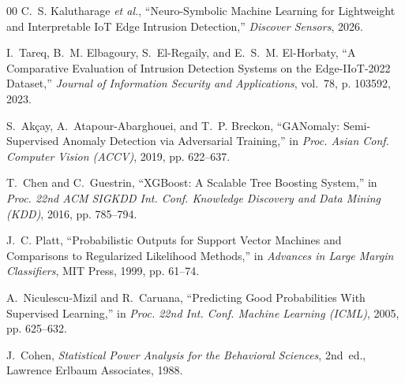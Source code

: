 \documentclass[pdflatex,sn-mathphys-num]{sn-jnl}
\theoremstyle{thmstyleone}
\theoremstyle{thmstyletwo}
\theoremstyle{thmstylethree}
\begin{document}
\begin{thebibliography}{00}
C.~S. Kalutharage \emph{et al.}, ``Neuro-Symbolic Machine Learning for Lightweight and Interpretable IoT Edge Intrusion Detection,'' \emph{Discover Sensors}, 2026.

I.~Tareq, B.~M. Elbagoury, S.~El-Regaily, and E.~S.~M. El-Horbaty, ``A Comparative Evaluation of Intrusion Detection Systems on the Edge-IIoT-2022 Dataset,'' \emph{Journal of Information Security and Applications}, vol.~78, p. 103592, 2023.

S.~Ak{\c c}ay, A.~Atapour-Abarghouei, and T.~P. Breckon, ``GANomaly: Semi-Supervised Anomaly Detection via Adversarial Training,'' in \emph{Proc. Asian Conf. Computer Vision (ACCV)}, 2019, pp. 622--637.

T.~Chen and C.~Guestrin, ``XGBoost: A Scalable Tree Boosting System,'' in \emph{Proc. 22nd ACM SIGKDD Int. Conf. Knowledge Discovery and Data Mining (KDD)}, 2016, pp. 785--794.

J.~C. Platt, ``Probabilistic Outputs for Support Vector Machines and Comparisons to Regularized Likelihood Methods,'' in \emph{Advances in Large Margin Classifiers}, MIT Press, 1999, pp. 61--74.

A.~Niculescu-Mizil and R.~Caruana, ``Predicting Good Probabilities With Supervised Learning,'' in \emph{Proc. 22nd Int. Conf. Machine Learning (ICML)}, 2005, pp. 625--632.

J.~Cohen, \emph{Statistical Power Analysis for the Behavioral Sciences}, 2nd~ed., Lawrence Erlbaum Associates, 1988.
\end{thebibliography}
\end{document}
